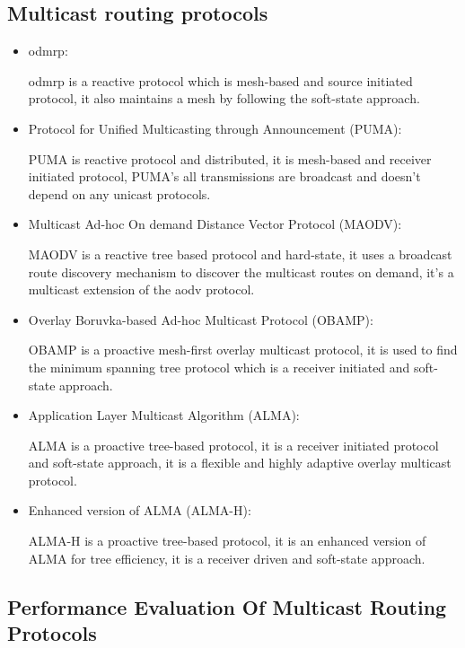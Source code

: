 \subsection{Multicast routing protocols}
\begin{itemize}[itemsep=1pt, topsep=5pt]
\item \acrfull{odmrp}:

\acrshort{odmrp} \cite{ODMRP} is a reactive protocol which is mesh-based and source initiated protocol, it also maintains a mesh by following the soft-state approach.

\item Protocol for Unified Multicasting through Announcement (PUMA):

PUMA \cite{PUMA} is reactive protocol and distributed, it is mesh-based and receiver initiated protocol, PUMA’s all transmissions are broadcast and doesn’t depend on any unicast protocols.

\item Multicast Ad-hoc On demand Distance Vector Protocol (MAODV):

MAODV \cite{MAODV} is a reactive tree based protocol and hard-state, it uses a broadcast route discovery mechanism to discover the multicast routes on demand, it’s a multicast extension of the \acrshort{aodv} protocol.\cite{chow2008multiple}

\item Overlay Boruvka-based Ad-hoc Multicast Protocol (OBAMP):

OBAMP \cite{OBAMP} is a proactive mesh-first overlay multicast protocol, it is used to find the minimum spanning tree protocol which is a receiver initiated and soft-state approach.

\item Application Layer Multicast Algorithm (ALMA):

ALMA \cite{ALMA} is a proactive tree-based protocol, it is a receiver initiated protocol and soft-state approach, it is a flexible and highly adaptive overlay multicast protocol.

\item Enhanced version of ALMA (ALMA-H):

ALMA-H \cite{ALMA} is a proactive tree-based protocol, it is an enhanced version of ALMA for tree efficiency, it is a receiver driven and soft-state approach.


\end{itemize}

\subsection{Performance Evaluation Of Multicast Routing Protocols}

